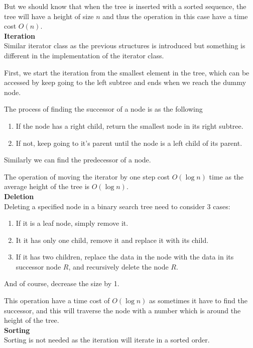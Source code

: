 \documentclass{article}
\begin{document}
		But we should know that when the tree is inserted with a sorted sequence, the tree will have a height of size $n$ and thus the operation in this case have a time cost $O(n)$.  \\
	
	\noindent\textbf{Iteration}\\
		Similar iterator class as the previous structures is introduced but something is different in the implementation of the iterator class.
		
		First, we start the iteration from the smallest element in the tree, which can be accessed by keep going to the left subtree and ends when we reach the dummy node.
		
		The process of finding the successor of a node is as the following
		\begin{enumerate}
			\item If the node has a right child, return the smallest node in its right subtree.
			\item If not, keep going to it's parent until the node is a left child of its parent. 
		\end{enumerate}
		
		Similarly we can find the predecessor of a node.
		
		The operation of moving the iterator by one step cost $O(\log n)$ time as the average height of the tree is $O(\log n)$.\\
	
	\noindent\textbf{Deletion} \\
		Deleting a specified node in a binary search tree need to consider 3 cases:
		\begin{enumerate}
			\item If it is a leaf node, simply remove it.
			\item It it has only one child, remove it and replace it with its child.
			\item If it has two children, replace the data in the node with the data in its successor node $R$, and recursively delete the node $R$.
		\end{enumerate}
		And of course, decrease the size by 1.

		This operation have a time cost of $O(\log n)$ as sometimes it have to find the successor, and this will traverse the node with a number which is around the height of the tree.\\
	
	\noindent\textbf{Sorting}\\
		Sorting is not needed as the iteration will iterate in a sorted order.
		
\end{document}
